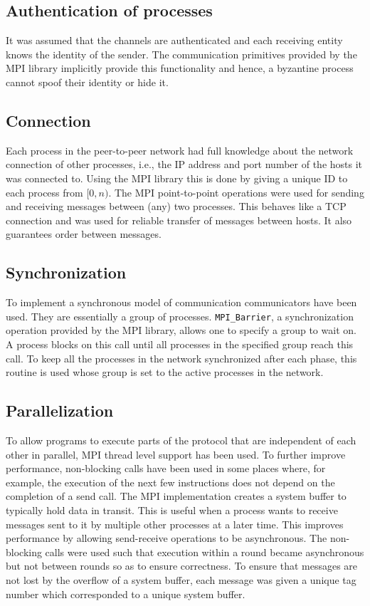 \subsection{Authentication of processes} It was assumed that the channels are
authenticated and each receiving entity knows the identity of the sender. The
communication primitives provided by the MPI library implicitly provide this
functionality and hence, a byzantine process cannot spoof their identity or
hide it.

\subsection{Connection} Each process in the peer-to-peer network had full
knowledge about the network connection of other processes, i.e., the IP address
and port number of the hosts it was connected to. Using the MPI library this is
done by giving a unique ID to each process from $[0, n)$. The MPI
    point-to-point operations were used for sending and receiving messages
    between (any) two processes. This behaves like a TCP connection and was
    used for reliable transfer of messages between hosts. It also guarantees
    order between messages.

\subsection{Synchronization} To implement a synchronous model of communication
communicators have been used. They are essentially a group of processes.
\texttt{MPI\_Barrier}, a synchronization operation provided by the MPI library,
allows one to specify a group to wait on. A process blocks on this call until
all processes in the specified group reach this call. To keep all the processes
in the network synchronized after each phase, this routine is used whose group
is set to the active processes in the network.

\subsection{Parallelization} To allow programs to execute parts of the protocol
that are independent of each other in parallel, MPI thread level support has
been used. To further improve performance, non-blocking calls have been used in
some places where, for example, the execution of the next few instructions does
not depend on the completion of a send call. The MPI implementation creates
a system buffer to typically hold data in transit. This is useful when
a process wants to receive messages sent to it by multiple other processes at
a later time. This improves performance by allowing send-receive operations to
be asynchronous. The non-blocking calls were used such that execution within
a round became asynchronous but not between rounds so as to ensure correctness.
To ensure that messages are not lost by the overflow of a system buffer, each
message was given a unique tag number which corresponded to a unique system
buffer.



